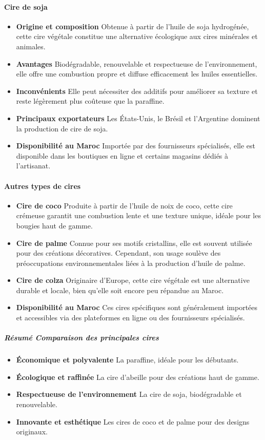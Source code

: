 \documentclass[11pt,fleqn,onecolumn,oneside]{book}
\begin{document}
\paragraph{Cire de soja}
\begin{itemize}
    \item \textbf{Origine et composition} Obtenue à partir de l’huile de soja hydrogénée, cette cire végétale constitue une alternative écologique aux cires minérales et animales.
    \item \textbf{Avantages} Biodégradable, renouvelable et respectueuse de l’environnement, elle offre une combustion propre et diffuse efficacement les huiles essentielles.
    \item \textbf{Inconvénients} Elle peut nécessiter des additifs pour améliorer sa texture et reste légèrement plus coûteuse que la paraffine.
    \item \textbf{Principaux exportateurs} Les États-Unis, le Brésil et l’Argentine dominent la production de cire de soja.
    \item \textbf{Disponibilité au Maroc} Importée par des fournisseurs spécialisés, elle est disponible dans les boutiques en ligne et certains magasins dédiés à l’artisanat.
\end{itemize}

\paragraph{Autres types de cires}
\begin{itemize}
    \item \textbf{Cire de coco} Produite à partir de l’huile de noix de coco, cette cire crémeuse garantit une combustion lente et une texture unique, idéale pour les bougies haut de gamme.
    \item \textbf{Cire de palme} Connue pour ses motifs cristallins, elle est souvent utilisée pour des créations décoratives. Cependant, son usage soulève des préoccupations environnementales liées à la production d’huile de palme.
    \item \textbf{Cire de colza} Originaire d’Europe, cette cire végétale est une alternative durable et locale, bien qu’elle soit encore peu répandue au Maroc.
    \item \textbf{Disponibilité au Maroc} Ces cires spécifiques sont généralement importées et accessibles via des plateformes en ligne ou des fournisseurs spécialisés.
\end{itemize}

\subparagraph{Résumé Comparaison des principales cires}
\begin{itemize}
    \item \textbf{Économique et polyvalente} La paraffine, idéale pour les débutants.
    \item \textbf{Écologique et raffinée} La cire d’abeille pour des créations haut de gamme.
    \item \textbf{Respectueuse de l’environnement} La cire de soja, biodégradable et renouvelable.
    \item \textbf{Innovante et esthétique} Les cires de coco et de palme pour des designs originaux.
\end{itemize}
\end{document}

